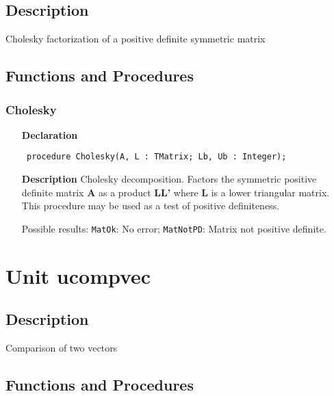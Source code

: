 \documentclass[12pt,a4paper,oneside]{report}
\newcommand{\declarationitem}[1]{\textbf{#1}}
\newcommand{\descriptiontitle}[1]{\textbf{#1}}
\newcommand{\code}[1]{\texttt{#1}}
\begin{document}
\subsection{Description}
Cholesky factorization of a positive definite symmetric matrix
\subsection{Functions and Procedures}
\subsubsection{Cholesky}
\label{ucholesk-Cholesky}
\begin{itemize}\item[\declarationitem{Declaration}\hfill]
	\begin{flushleft}
		\code{
			procedure Cholesky(A, L : TMatrix; Lb, Ub : Integer);}
		
	\end{flushleft}
	
	\par
	\item[\descriptiontitle{Description}]
	Cholesky decomposition. Factors the symmetric positive definite matrix \textbf{A} as a product \textbf{LL'} where \textbf{L} is a lower triangular matrix. This procedure may be used as a test of positive definiteness.
	
	Possible results: \code{MatOk}: No error; \code{MatNotPD}: Matrix not positive definite.
	
\end{itemize}
\section{Unit ucompvec}
\label{ucompvec}
\subsection{Description}
Comparison of two vectors 
\subsection{Functions and Procedures}
\end{document}
